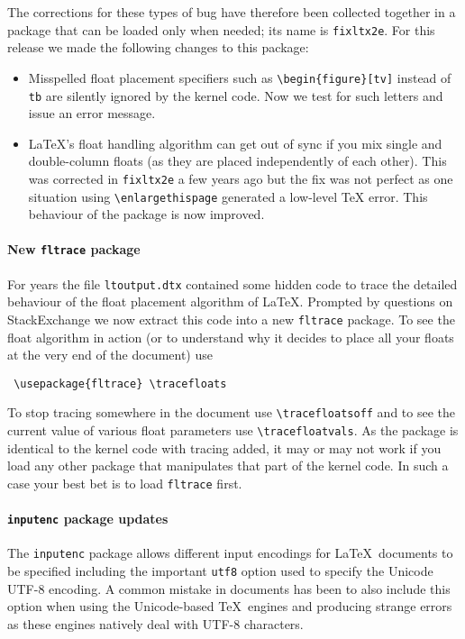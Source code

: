 \documentclass{ltnews}
\providecommand\pkg[1]{\texttt{#1}}
\providecommand\option[1]{\texttt{#1}}
\providecommand\file[1]{\texttt{#1}}
\begin{document}
The corrections for these types of bug have therefore been collected together
in a package that can be loaded only when needed; its name is \pkg{fixltx2e}.
For this release we made the following changes to this package:
\begin{itemize}
\item
   Misspelled float placement specifiers such as
   \verb=\begin{figure}[tv]= instead of \texttt{tb} are silently
   ignored by the kernel code.  Now we test for such letters and issue
   an error message.
\item
   \LaTeX's float handling algorithm can get out of sync if you mix
   single and double-column floats (as they are placed independently
   of each other). This was corrected in \pkg{fixltx2e} a few years ago
   but the fix was not perfect as one situation using
   \verb=\enlargethispage= generated a low-level \TeX{} error.
   This behaviour of the package is now improved.
\end{itemize}




\paragraph{New \pkg{fltrace} package}

For years the file \file{ltoutput.dtx} contained some hidden code to
trace the detailed behaviour of the float placement algorithm of
\LaTeX. Prompted by questions on StackExchange we now extract this
code into a new \pkg{fltrace} package. To see the float algorithm
in action (or to understand why it decides to place all your floats at
the very end of the document) use
\begin{verbatim}
 \usepackage{fltrace} \tracefloats
\end{verbatim}
To stop tracing somewhere in the document use
\verb=\tracefloatsoff= and to see the current value of various float
parameters use \verb=\tracefloatvals=. As the package is identical to
the kernel code with tracing added, it may or may not work if you load any
other package that manipulates that part of the kernel code. In such a
case your best bet is to load \pkg{fltrace} first.

\paragraph{\pkg{inputenc} package updates}

The \pkg{inputenc} package allows different input encodings for
\LaTeX\ documents to be specified including the important
\option{utf8} option used to specify the Unicode UTF-8 encoding. A
common mistake in documents has been to also include this option when
using the Unicode-based \TeX\ engines  and 
producing strange errors as these engines natively deal with UTF-8
characters.
\end{document}
